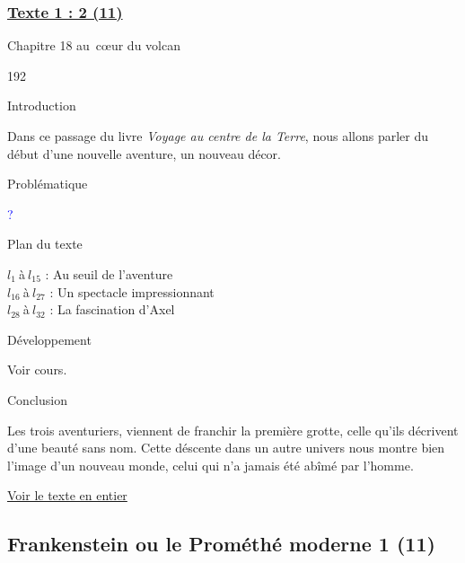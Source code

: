 \documentclass[12pt,a4paper]{article}
\begin{document}
				\subsubsection[Texte 2 (10)]{\textbf{\underline{Texte 1 : 2 (11)}}}
		Chapitre 18 au~c\oe ur du volcan
\begin{dingautolist}{192}

\item Introduction \par
Dans ce passage du livre \textit{Voyage au centre de la Terre}, nous allons parler du début d'une nouvelle aventure, un nouveau décor. 


\item Probl\'ematique \par
	\textcolor{blue}{?}
\item Plan du texte \par
	$l_{1}~$\`a$~l_{15}$ : Au seuil de l'aventure\\
    $l_{16}~$\`a$~l_{27}$ : Un spectacle impressionnant\\
    $l_{28}~$\`a$~l_{32}$ : La fascination d'Axel

\item D\'eveloppement \par
        Voir cours.

\item Conclusion \par
Les trois aventuriers, viennent de franchir la première grotte, celle qu'ils décrivent d'une beauté sans nom. Cette déscente dans un autre univers nous montre bien l'image d'un nouveau monde, celui qui n'a jamais été abîmé par l'homme. 

\end{dingautolist}
\href{.extra/Textes/Chapitre_18_Jules_Vernes.pdf}{Voir le texte en entier}

\newpage
\subsection{Frankenstein ou le Prom\'eth\'e moderne 1 (11) }
\end{document}
